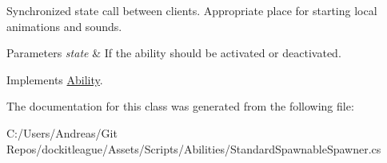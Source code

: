 Synchronized state call between clients. Appropriate place for starting local animations and sounds. 


\begin{DoxyParams}{Parameters}
{\em state} & If the ability should be activated or deactivated.\\
\hline
\end{DoxyParams}


Implements \hyperlink{class_ability_a10f7f3c2b63eeef6e352aee48d246384}{Ability}.



The documentation for this class was generated from the following file\+:\begin{DoxyCompactItemize}
\item 
C\+:/\+Users/\+Andreas/\+Git Repos/dockitleague/\+Assets/\+Scripts/\+Abilities/Standard\+Spawnable\+Spawner.\+cs\end{DoxyCompactItemize}
